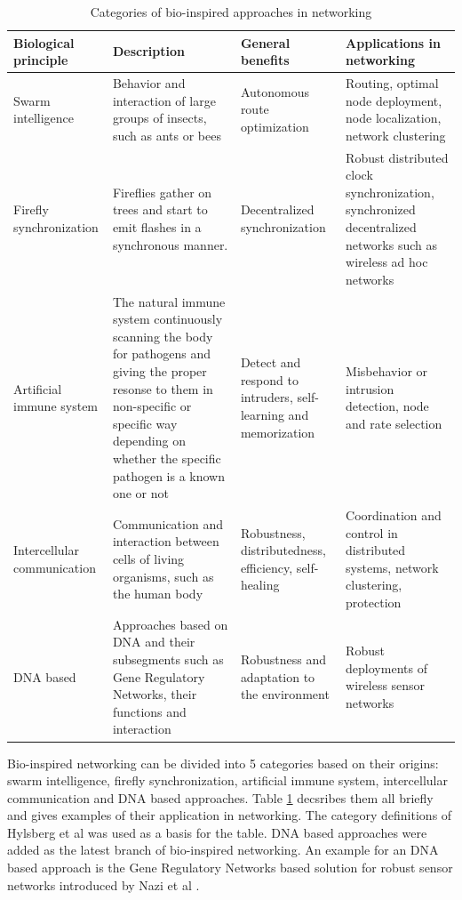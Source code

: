 \documentclass[cameraready]{IWORK2014}
\begin{document}
\begin{table}
	\begin{tabularx}{0.90\textwidth}{|X|X|X|X|}
		\hline \textbf{Biological principle} & \textbf{Description} & \textbf{General benefits} & \textbf{Applications in networking} \\ \hline
		Swarm intelligence & Behavior and interaction of large groups of insects, such as ants or bees & Autonomous route optimization & Routing, optimal node deployment, node localization, network clustering \\ \hline
		Firefly synchronization & Fireflies gather on trees and start to emit flashes in a synchronous manner. & Decentralized synchronization & Robust distributed clock synchronization, synchronized decentralized networks such as wireless ad hoc networks \\ \hline
		Artificial immune system & The natural immune system continuously scanning the body for pathogens and giving the proper resonse to them in non-specific or specific way depending on whether the specific pathogen is a known one or not & Detect and respond to intruders, self-learning and memorization & Misbehavior or intrusion detection, node and rate selection \\ \hline
		Intercellular communication & Communication and interaction between cells of living organisms, such as the human body & Robustness, distributedness, efficiency, self-healing & Coordination and control in distributed systems, network clustering, protection \\ \hline
		DNA based & Approaches based on DNA and their subsegments such as Gene Regulatory Networks, their functions and interaction & Robustness and adaptation to the environment & Robust deployments of wireless sensor networks \\ \hline
	\end{tabularx}
	\caption{Categories of bio-inspired approaches in networking}
	\label{tbl:bio-categories}
\end{table}

Bio-inspired networking can be divided into 5 categories based on their origins: swarm intelligence, firefly synchronization, artificial immune system, intercellular communication and DNA based approaches. Table \ref{tbl:bio-categories} decsribes them all briefly and gives examples of their application in networking. The category definitions of Hylsberg et al \cite{hylsberg2011bioinspired} was used as a basis for the table. DNA based approaches were added as the latest branch of bio-inspired networking. An example for an DNA based approach is the Gene Regulatory Networks based solution for robust sensor networks introduced by Nazi et al \cite{nazi2014deployment}.
\end{document}
